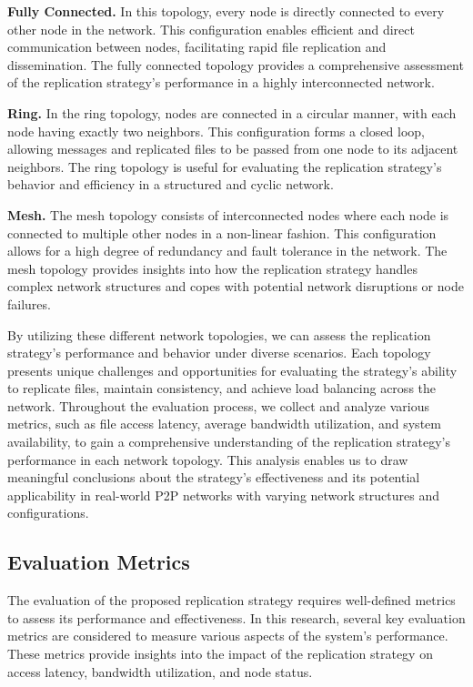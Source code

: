 \documentclass[10pt, conference]{IEEEtran}
\begin{document}
\noindent \textbf{Fully Connected.} In this topology, every node is directly connected to every other node in the network. This configuration enables efficient and direct communication between nodes, facilitating rapid file replication and dissemination. The fully connected topology provides a comprehensive assessment of the replication strategy's performance in a highly interconnected network.

\noindent \textbf{Ring.} In the ring topology, nodes are connected in a circular manner, with each node having exactly two neighbors. This configuration forms a closed loop, allowing messages and replicated files to be passed from one node to its adjacent neighbors. The ring topology is useful for evaluating the replication strategy's behavior and efficiency in a structured and cyclic network.

\noindent \textbf{Mesh.} The mesh topology consists of interconnected nodes where each node is connected to multiple other nodes in a non-linear fashion. This configuration allows for a high degree of redundancy and fault tolerance in the network. The mesh topology provides insights into how the replication strategy handles complex network structures and copes with potential network disruptions or node failures.

By utilizing these different network topologies, we can assess the replication strategy's performance and behavior under diverse scenarios. Each topology presents unique challenges and opportunities for evaluating the strategy's ability to replicate files, maintain consistency, and achieve load balancing across the network. Throughout the evaluation process, we collect and analyze various metrics, such as file access latency, average bandwidth utilization, and system availability, to gain a comprehensive understanding of the replication strategy's performance in each network topology. This analysis enables us to draw meaningful conclusions about the strategy's effectiveness and its potential applicability in real-world P2P networks with varying network structures and configurations.

\subsection{Evaluation Metrics}\label{subsec:metrics}
The evaluation of the proposed replication strategy requires well-defined metrics to assess its performance and effectiveness. In this research, several key evaluation metrics are considered to measure various aspects of the system's performance. These metrics provide insights into the impact of the replication strategy on access latency, bandwidth utilization, and node status.
\end{document}
